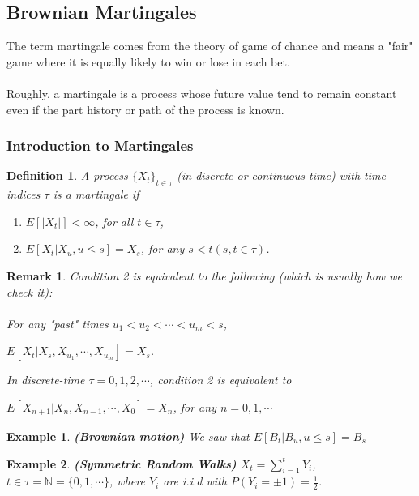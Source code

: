\documentclass[12pt]{article}
\newtheorem{definition}{Definition}
\newtheorem*{remark}{Remark}
\newtheorem{example}{Example}
\begin{document}
\subsection{Brownian Martingales}
The term martingale comes from the theory of game of chance and means a "fair" game where it is equally likely to win or lose in each bet.
\\
\\Roughly, a martingale is a process whose future value tend to remain constant even if the part history or path of the process is known.

\subsubsection{Introduction to Martingales}

\begin{definition}
    A process $\{X_t\}_{t \in \tau}$ (in discrete or continuous time) with time indices $\tau$ is a martingale if
    \begin{enumerate}
        \item $E[|X_t|] < \infty$, for all $t \in \tau$,
        \item $E[X_t | X_u, u \leq s] = X_s$, for any $s < t (s,t \in \tau)$.
    \end{enumerate}
\end{definition}

\begin{remark}
    Condition 2 is equivalent to the following (which is usually how we check it):
    \\
    \\ For any "past" times $u_1 < u_2 < \cdots < u_m < s$,
    \begin{center}
        $E[X_t | X_s, X_{u_1}, \cdots, X_{u_m}] = X_s$.
    \end{center}
    \noindent In discrete-time $\tau = {0,1,2, \cdots}$, condition 2 is equivalent to
    \begin{center}
        $E[X_{n+1}|X_n,X_{n-1}, \cdots, X_0] = X_n$, for any $n = 0,1, \cdots$
    \end{center}
\end{remark}

\begin{example}
    \textbf{(Brownian motion)} We saw that $E[B_t | B_u, u \leq s] = B_s$
\end{example}

\begin{example}
    \textbf{(Symmetric Random Walks)} $X_t =  {\textstyle \sum_{i=1}^{t}} Y_i$, $t \in \tau = \mathbb{N} = \{0, 1, \cdots \}$, where $Y_i$ are i.i.d with $P(Y_i = \pm 1) = \frac{1}{2}$.
\end{example}
\end{document}
